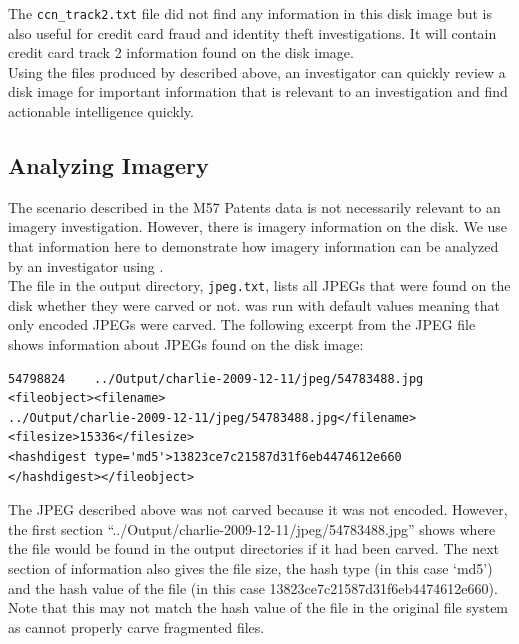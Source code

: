 The \texttt{ccn\_track2.txt} file did not find any information in this disk image but is also useful for credit card fraud and identity theft investigations. It will contain credit card track 2 information found on the disk image.\\

Using the files produced by \bulk described above, an investigator can quickly review a disk image for important information that is relevant to an investigation and find actionable intelligence quickly.

\subsection{Analyzing Imagery}
The scenario described in the M57 Patents data is not necessarily relevant to an imagery investigation. However, there is imagery information on the disk. We use that information here to demonstrate how imagery information can be analyzed by an investigator using \bulk.\\

The file in the output directory, \texttt{jpeg.txt}, lists all JPEGs that were found on the disk whether they were carved or not. \bulk was run with default values meaning that only encoded JPEGs were carved. The following excerpt from the JPEG file shows information about JPEGs found on the disk image:
\lstset{style=customfile}
\begin{lstlisting}
54798824	../Output/charlie-2009-12-11/jpeg/54783488.jpg	<fileobject><filename>
../Output/charlie-2009-12-11/jpeg/54783488.jpg</filename><filesize>15336</filesize>
<hashdigest type='md5'>13823ce7c21587d31f6eb4474612e660
</hashdigest></fileobject>
\end{lstlisting}
The JPEG described above was not carved because it was not encoded. However, the first section ``../Output/charlie-2009-12-11/jpeg/54783488.jpg'' shows where the file would be found in the output directories if it had been carved. The next section of information also gives the file size, the hash type (in this case `md5') and the hash value of the file (in this case 13823ce7c21587d31f6eb4474612e660). Note that this may not match the hash value of the file in the original file system as \bulk cannot properly carve fragmented files.\\

